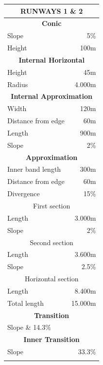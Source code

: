 	\begin{longtable}[htb]{@{}lr@{}}
		\toprule[3pt]
		\multicolumn{2}{c}{\textbf{\large RUNWAYS 1 \& 2  } }\\ \midrule[2pt]
		\multicolumn{2}{c}{\textbf{Conic} }\\
		\midrule[0.5pt]
		Slope & 5\%\\
		Height & 100m\\
		\midrule[2pt]
		\multicolumn{2}{c}{\textbf{Internal Horizontal} }\\
		\midrule[0.5pt]
		Height & 45m\\
		Radius & 4.000m\\
		\midrule[2pt]
		\multicolumn{2}{c}{\textbf{Internal Approximation} }\\
		\midrule[0.5pt]
		Width & 120m\\
		Distance from edge & 60m\\
		Length & 900m\\
		Slope & 2\% \\
		\midrule[2pt]
		\multicolumn{2}{c}{\textbf{Approximation} }\\
		\midrule[0.5pt]
		Inner band length & 300m\\
		Distance from edge & 60m\\
		Divergence & 15\% \\
		\midrule[0.5pt]
		\multicolumn{2}{c}{First section} \\
		\midrule[0.5pt]
		Length & 3.000m\\
		Slope & 2\%\\
		\midrule[0.5pt]
		\multicolumn{2}{c}{Second section} \\
		\midrule[0.5pt]
		Length & 3.600m\\
		Slope & 2.5\%\\
		\midrule[0.5pt]
		\multicolumn{2}{c}{Horizontal section} \\
		\midrule[0.5pt]
		Length & 8.400m\\
		Total length & 15.000m\\
		\midrule[2pt]
		\multicolumn{2}{c}{\textbf{Transition} }\\
		\midrule[0.5pt]
		Slope \& 14.3\%\\
		\midrule[2pt]
		\multicolumn{2}{c}{\textbf{Inner Transition} }\\
		\midrule[0.5pt]
		Slope & 33.3\%\\
		\midrule[2pt]
		\vspace{5cm}&\vspace{5cm}\\

\end{longtable}
